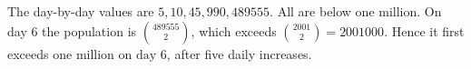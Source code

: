 The day-by-day values are $5,10,45,990,489555$. All are below one million. On day 6 the population is $\binom{489555}{2}$, which exceeds $\binom{2001}{2}=2001000$. Hence it first exceeds one million on $\boxed{\text{day 6}}$, after five daily increases.
